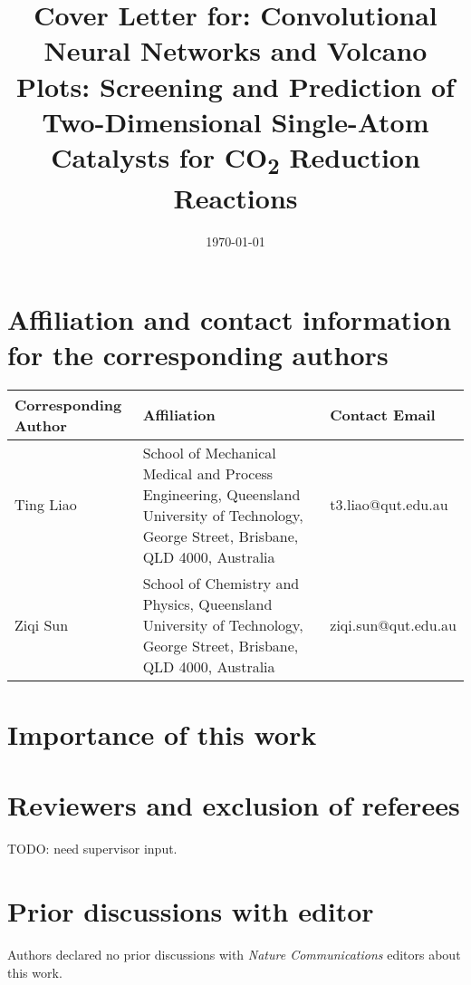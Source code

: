 \documentclass[a4paper, 12pt]{article}
\begin{document}
\title{Cover Letter for: Convolutional Neural Networks and Volcano Plots:
    Screening and Prediction of Two-Dimensional Single-Atom Catalysts
    for CO\textsubscript{2} Reduction Reactions}

\date{\today}
\maketitle
\newpage


\section{Affiliation and contact information for the corresponding authors}

\begin{table}[htbp]
    \label{cov_let_table:corr_author_contact}
    \centering
    \begin{tabular}{p{3cm}p{6cm}l}
    \toprule
    Corresponding Author  & Affiliation                                             & Contact Email       \\
    \midrule
    Ting Liao             & School of Mechanical Medical and Process Engineering,
                            Queensland University of Technology, George Street,
                            Brisbane, QLD 4000, Australia                           & t3.liao@qut.edu.au   \\
    Ziqi Sun              & School of Chemistry and Physics,
                            Queensland University of Technology, George Street,
                            Brisbane, QLD 4000, Australia                           & ziqi.sun@qut.edu.au  \\
    \bottomrule
    \end{tabular}
\end{table}


\section{Importance of this work}


\section{Reviewers and exclusion of referees}

TODO: need supervisor input.

\section{Prior discussions with editor}

Authors declared no prior discussions with \textit{Nature Communications} editors about this work.
\end{document}
